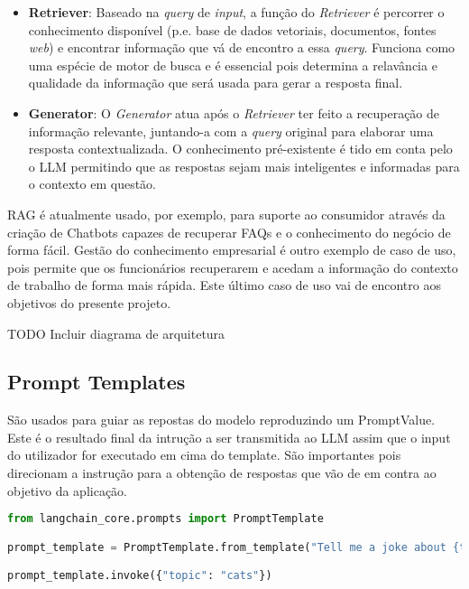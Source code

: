 \begin{itemize}
    \item \textbf{Retriever}: Baseado na \textit{query} de \textit{input}, a função do \textit{Retriever} é percorrer o conhecimento disponível (p.e. base de dados vetoriais, documentos, fontes \textit{web}) e encontrar informação que vá de encontro a essa \textit{query}. Funciona como uma espécie de motor de busca e é essencial pois determina a relavância e qualidade da informação que será usada para gerar a resposta final. 
    \item \textbf{Generator}: O \textit{Generator} atua após o \textit{Retriever} ter feito a recuperação de informação relevante, juntando-a com a \textit{query} original para elaborar uma resposta contextualizada. O conhecimento pré-existente é tido em conta pelo o LLM permitindo que as respostas sejam mais inteligentes e informadas para o contexto em questão. 
\end{itemize}


RAG é atualmente usado, por exemplo, para suporte ao consumidor através da criação de Chatbots capazes de recuperar FAQs e o conhecimento do negócio de forma fácil. Gestão do conhecimento empresarial é outro exemplo de caso de uso, pois permite que os funcionários recuperarem e acedam a informação do contexto de trabalho de forma mais rápida. Este último caso de uso vai de encontro aos objetivos do presente projeto. 

TODO Incluir diagrama de arquitetura



\subsection{Prompt Templates}

São usados para guiar as repostas do modelo reproduzindo um PromptValue. Este é o resultado final da intrução a ser transmitida ao LLM assim que o input do utilizador for executado em cima do template. São importantes pois direcionam a instrução para a obtenção de respostas que vão de em contra ao objetivo da aplicação. 

\begin{lstlisting}[language=Python, caption={Using LangChain to create a prompt template}, label={lst:joke-prompt}]
from langchain_core.prompts import PromptTemplate

prompt_template = PromptTemplate.from_template("Tell me a joke about {topic}")

prompt_template.invoke({"topic": "cats"})
\end{lstlisting}

